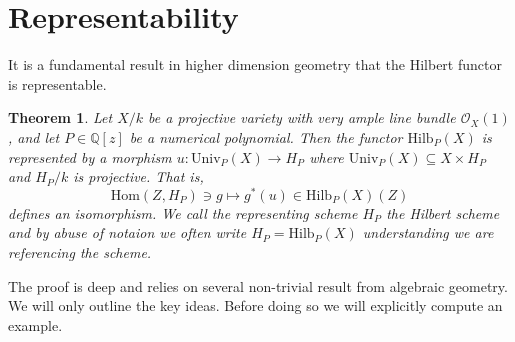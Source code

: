 \documentclass[12pt]{amsart}
\newtheorem{theorem}{Theorem}[section]
\numberwithin{equation}{section}
\theoremstyle{definition}
\newcommand{\QQ}{\mathbb{Q}}
\newcommand{\Hom}{\mathrm{Hom}}
\newcommand{\Hilb}{\mathrm{Hilb}}
\newcommand{\Univ}{\mathrm{Univ}}
\begin{document}
\section{Representability}

It is a fundamental result in higher dimension geometry that the Hilbert functor is representable.

\begin{theorem}
Let $X/k$ be a projective variety with very ample line bundle $\mathcal{O}_X(1)$, and let $P \in \QQ[z]$ be a numerical polynomial. 
Then the functor $\Hilb_P(X)$ is represented by a morphism $u : \Univ_P(X) \to H_P$ where $\Univ_P(X) \subseteq X \times H_P$ and $H_P/k$ is projective.
That is,
\[
\Hom(Z, H_P) \ni g \mapsto g^*(u) \in \Hilb_P(X)(Z)
\]
defines an isomorphism.
We call the representing scheme $H_P$ the {\em Hilbert scheme} and by abuse of notaion we often write $H_P = \Hilb_P(X)$ understanding we are referencing the scheme. 
\end{theorem}    

The proof is deep and relies on several non-trivial result from algebraic geometry.
We will only outline the key ideas. 
Before doing so we will explicitly compute an example.
\end{document}

